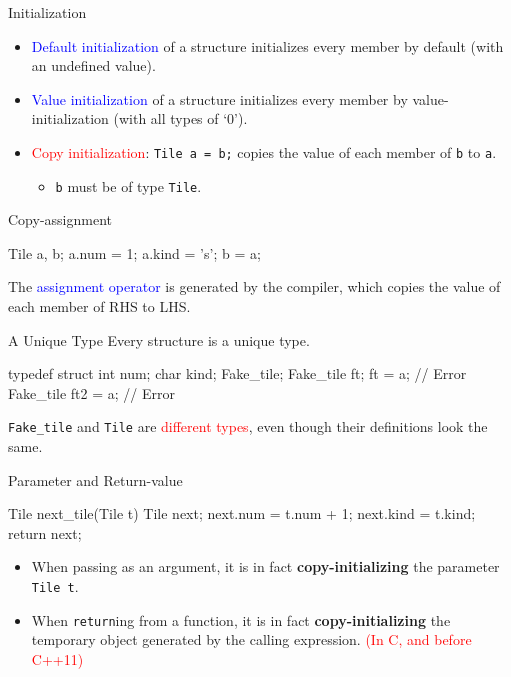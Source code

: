 \documentclass{beamer}
\newcommand{\red}[1]{\textcolor{red}{#1}}
\newcommand{\blue}[1]{\textcolor{blue}{#1}}
\newcommand{\ttt}[1]{\texttt{#1}}
\theoremstyle{definition}
\begin{document}
\begin{frame}[fragile]{Initialization}
    \begin{itemize}
        \item \blue{Default initialization} of a structure initializes every member by default (with an undefined value).
        \item \blue{Value initialization} of a structure initializes every member by value-initialization (with all types of `0').
        \pause
        \item \red{Copy initialization}: \ttt{Tile a = b;} copies the value of each member of \ttt{b} to \ttt{a}.
        \begin{itemize}
            \item \ttt{b} must be of type \ttt{Tile}.
        \end{itemize}
    \end{itemize}
\end{frame}

\begin{frame}[fragile]{Copy-assignment}
    \begin{cpp}
Tile a, b;
a.num = 1; a.kind = 's';
b = a;
    \end{cpp}
    The \blue{assignment operator} is generated by the compiler, which copies the value of each member of RHS to LHS.
\end{frame}

\begin{frame}[fragile]{A Unique Type}
    Every structure is a unique type.
    \pause
    \begin{cpp}
typedef struct {
  int num;
  char kind;
} Fake_tile;
Fake_tile ft;
ft = a;             // Error
Fake_tile ft2 = a;  // Error
    \end{cpp}
    \ttt{Fake\_tile} and \ttt{Tile} are \red{different types}, even though their definitions look the same.
\end{frame}

\begin{frame}[fragile]{Parameter and Return-value}
    \begin{cpp}
Tile next_tile(Tile t) {
  Tile next;
  next.num = t.num + 1;
  next.kind = t.kind;
  return next;
}
    \end{cpp}
    \pause
    \begin{itemize}
        \item When passing as an argument, it is in fact \textbf{copy-initializing} the parameter \ttt{Tile t}.
        \item When \ttt{return}ing from a function, it is in fact \textbf{copy-initializing} the temporary object generated by the calling expression. \red{(In C, and before C++11)}
    \end{itemize}
\end{frame}
\end{document}
